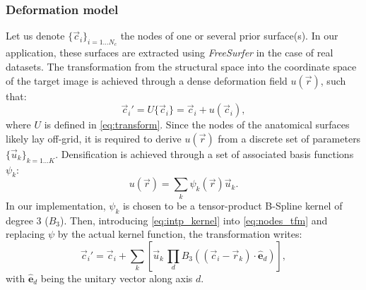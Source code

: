\subsubsection{Deformation model}
\label{sec:deformation_model}
Let us denote $\{\vec{c}_i\}_{i=1 \ldots N_c}$ the nodes of one or several prior
  surface(s).
In our application, these surfaces are extracted using \emph{FreeSurfer}
  \citep{fischl_freesurfer_2012} in the case of real datasets.
The transformation from the structural space into the coordinate space of the
  target image is achieved through a dense deformation field $u(\vec{r})$, such that:
  \begin{equation}
  \vec{c}_i' = U\{\vec{c}_i\} = \vec{c}_i + u(\vec{c}_i),
  \label{eq:nodes_tfm}
  \end{equation}
  where $U$ is defined in \eqref{eq:transform}.
Since the nodes of the anatomical surfaces likely lay off-grid, it is required to
  derive $u(\vec{r})$ from a discrete set of parameters $\{\vec{u}_k\}_{k=1 \ldots K}$.
Densification is achieved through a set of associated basis functions $\psi_k$:
  \begin{equation}
  u(\vec{r}) = \sum_k \psi_k(\vec{r}) \vec{u}_k.
  \label{eq:intp_kernel}
  \end{equation}
%
In our implementation, $\psi_k$ is chosen to be a tensor-product B-Spline kernel
  of degree 3 ($B_3$).
Then, introducing \eqref{eq:intp_kernel} into \eqref{eq:nodes_tfm} and replacing
  $\psi$ by the actual kernel function, the transformation writes:
  \begin{equation}
    \vec{c}_i' = \vec{c}_i + \sum_k \left[ \vec{u}_k \, \underset{d}{\prod}
      B_3( (\vec{c}_i - \vec{r}_k) \cdot \hat{\mathbf{e}}_d ) \right],
  \label{eq:transformation}
  \end{equation}
  with $\hat{\mathbf{e}}_d$ being the unitary vector along axis $d$.


